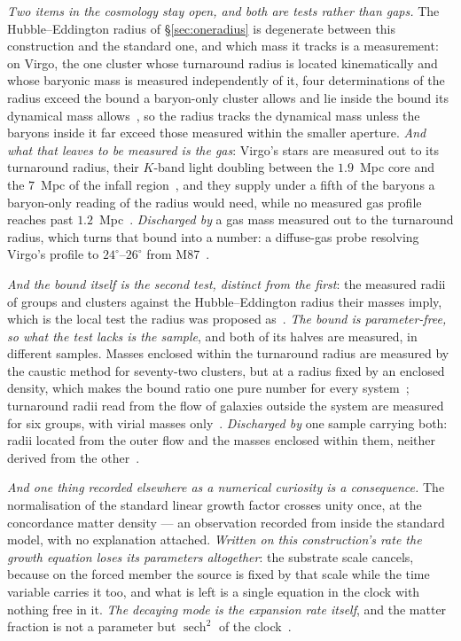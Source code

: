 \documentclass[11pt,a4paper]{article}
\theoremstyle{plain}
\theoremstyle{definition}
\begin{document}
\emph{Two items in the cosmology stay open, and both are tests rather than gaps.} The Hubble--Eddington radius of \S\ref{sec:oneradius} is
degenerate between this construction and the standard one, and which mass it tracks is a measurement: on Virgo,
the one cluster whose turnaround radius is located kinematically and whose baryonic mass is measured
independently of it, four determinations of the radius exceed the bound a baryon-only cluster allows and lie
inside the bound its dynamical mass allows~\cite{JanzenSlicing}, so the radius tracks the dynamical mass unless
the baryons inside it far exceed those measured within the smaller aperture. \emph{And what that leaves to be
measured is the gas}: Virgo's stars are measured out to its turnaround radius, their $K$-band light doubling between the
$1.9$~Mpc core and the $7$~Mpc of the infall region~\cite{KourkchiTully2017}, and they supply under a fifth of the
baryons a baryon-only reading of the radius would need, while no measured gas profile reaches past
$1.2$~Mpc~\cite{Urban2011}. \emph{Discharged by} a gas mass measured out to the turnaround radius, which turns that
bound into a number: a diffuse-gas probe resolving Virgo's profile to $24^{\circ}$--$26^{\circ}$ from M87~\cite{JanzenCRframework}.

\emph{And the bound itself is the second test, distinct from the first}: the measured radii of groups and clusters
against the Hubble--Eddington radius their masses imply, which is the local test the radius was proposed
as~\cite{PavlidouTomaras2014,JanzenSlicing}. \emph{The bound is parameter-free, so what the test lacks is the
sample}, and both of its halves are measured, in different samples. Masses enclosed within the turnaround radius
are measured by the caustic method for seventy-two clusters, but at a radius fixed by an enclosed density, which
makes the bound ratio one pure number for every system~\cite{RinesDiaferio2006}; turnaround radii read from the
flow of galaxies outside the system are measured for six groups, with virial masses only~\cite{LeeKimRey2018}.
\emph{Discharged by} one sample carrying both: radii located from the outer flow and the masses enclosed within
them, neither derived from the other~\cite{JanzenCRframework}.

\emph{And one thing recorded elsewhere as a numerical curiosity is a consequence.} The normalisation
of the standard linear growth factor crosses unity once, at the concordance matter density --- an observation
recorded from inside the standard model, with no explanation attached. \emph{Written on this construction's
rate the growth equation loses its parameters altogether}: the substrate scale cancels, because on the forced
member the source is fixed by that scale while the time variable carries it too, and what is left is a single
equation in the clock with nothing free in it. \emph{The decaying mode is the expansion rate itself}, and the
matter fraction is not a parameter but $\operatorname{sech}^{2}$ of the clock~\cite{JanzenCRcosmology}.
\end{document}
